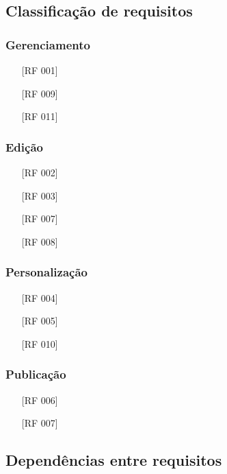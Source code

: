 \documentclass[ppginf, pep]{esinucpel}
\begin{document}
\subsection{Classificação de requisitos}

\subsubsection{Gerenciamento}

\begin{itemize}
\item[\textbullet] [RF 001]
\item[\textbullet] [RF 009]
\item[\textbullet] [RF 011]
\end{itemize}

\subsubsection{Edição}

\begin{itemize}
\item[\textbullet] [RF 002]
\item[\textbullet] [RF 003]
\item[\textbullet] [RF 007]
\item[\textbullet] [RF 008]
\end{itemize}

\subsubsection{Personalização}

\begin{itemize}
\item[\textbullet] [RF 004]
\item[\textbullet] [RF 005]
\item[\textbullet] [RF 010]
\end{itemize}

\subsubsection{Publicação}

\begin{itemize}
\item[\textbullet] [RF 006]
\item[\textbullet] [RF 007]
\end{itemize}

\subsection{Dependências entre requisitos}
\end{document}
